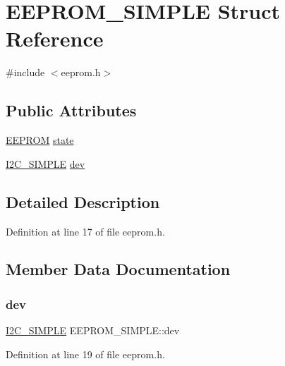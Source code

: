 \hypertarget{structEEPROM__SIMPLE}{}\section{E\+E\+P\+R\+O\+M\+\_\+\+S\+I\+M\+P\+LE Struct Reference}
\label{structEEPROM__SIMPLE}


{\ttfamily \#include $<$eeprom.\+h$>$}

\subsection*{Public Attributes}
\begin{DoxyCompactItemize}
\item 
\mbox{\hyperlink{structEEPROM}{E\+E\+P\+R\+OM}} \mbox{\hyperlink{structEEPROM__SIMPLE_a7e8806de94507a82bf9339718ab20b49}{state}}
\item 
\mbox{\hyperlink{structI2C__SIMPLE}{I2\+C\+\_\+\+S\+I\+M\+P\+LE}} \mbox{\hyperlink{structEEPROM__SIMPLE_a3ca4fa66ad98472422df105318b7de50}{dev}}
\end{DoxyCompactItemize}


\subsection{Detailed Description}


Definition at line 17 of file eeprom.\+h.



\subsection{Member Data Documentation}
\mbox{\label{structEEPROM__SIMPLE_a3ca4fa66ad98472422df105318b7de50}} 
\subsubsection{\texorpdfstring{dev}{dev}}
{\footnotesize\ttfamily \mbox{\hyperlink{structI2C__SIMPLE}{I2\+C\+\_\+\+S\+I\+M\+P\+LE}} E\+E\+P\+R\+O\+M\+\_\+\+S\+I\+M\+P\+L\+E\+::dev}



Definition at line 19 of file eeprom.\+h.

\mbox{\label{structEEPROM__SIMPLE_a7e8806de94507a82bf9339718ab20b49}} 
